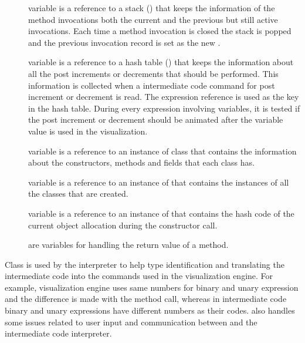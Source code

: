 \begin{description}
\item[] variable is a reference to a stack () that keeps the information of the method invocations both the current and the previous but still active invocations. Each time a method invocation is closed the stack is popped and the previous invocation record is set as the new .

\item[] variable is a reference to a hash table () that keeps the information about all the post increments or decrements that should be performed. This information is collected when a intermediate code command for post increment or decrement is read. The expression reference is used as the key in the hash table. During every expression involving variables, it is tested if the post increment or decrement should be animated after the variable value is used in the visualization.

\item[] variable is a reference to an instance of  class that contains the information about the constructors, methods and fields that each class has. 

\item[] variable is a reference to an instance of  that contains the  instances of all the classes that are created.

\item[] variable is a reference to an instance of  that contains the hash code of the current object allocation during the constructor call.

\item[] are variables for handling the return value of a method.

\end{description}

Class  is used by the interpreter to help type identification and translating the intermediate code into the commands used in the visualization engine. For example, visualization engine uses same numbers for binary and unary expression and the difference is made with the method call, whereas in intermediate code binary and unary expressions have different numbers as their codes.  also handles some issues related to user input and communication between \djava{} and the intermediate code interpreter.

